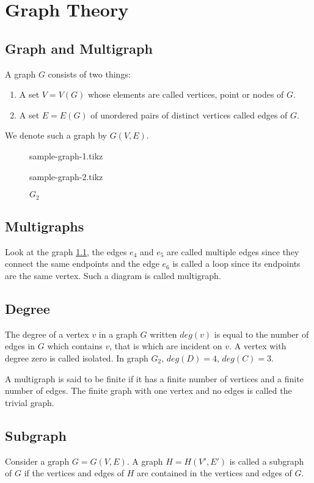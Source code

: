 \documentclass[../main-sheet.tex]{subfiles}
\begin{document}
\chapter{Graph Theory}
\section{Graph and Multigraph}
A graph $ G $ consists of two things:
\begin{enumerate}[label=(\roman*)]
    \item A set $ V=V(G) $ whose elements are called vertices, point or nodes of $ G $.
    \item A set $ E=E(G) $ of unordered pairs of distinct vertices called edges of $ G $.
\end{enumerate}
We denote such a graph by $ G(V,E) $.\\
\begin{figure}[h]
    \begin{minipage}[b]{0.5\textwidth}
        \centering
        {sample-graph-1.tikz}
        \caption{$ G_1 $}
        \label{fig:graph1}
    \end{minipage}
    \begin{minipage}[b]{0.5\textwidth}
        \centering
        {sample-graph-2.tikz}
        \caption{$ G_2 $}
        \label{fig:graph2}
    \end{minipage}
\end{figure}
\section{Multigraphs} 
Look at the graph \ref{fig:graph2}, the edges $ e_4 $ and $ e_5 $ are called multiple edges since they connect the same endpoints and the edge $ e_6 $ is called a loop since its endpoints are the same vertex. Such a diagram is called multigraph.
\section{Degree}
The degree of a vertex $ v $ in a graph $ G $ written $ deg(v) $ is equal to the number of edges in $ G $ which contains $ v $, that is which are incident on $ v $. A vertex with degree zero is called isolated. In graph $ G_2 $, $ deg(D)=4,\,deg(C)=3 $.

A multigraph is said to be finite if it has a finite number of vertices and a finite number of edges. The finite graph with one vertex and no edges is called the trivial graph.
\section{Subgraph}
Consider a graph $ G=G(V,E) $. A graph $ H=H(V',E') $ is called a subgraph of $ G $ if the vertices and edges of $ H $ are contained in the vertices and edges of $ G $.
\end{document}
